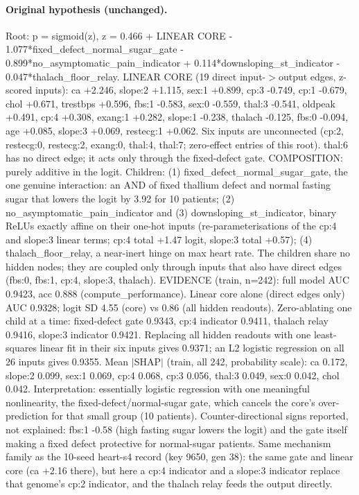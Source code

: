 \documentclass[a4paper,10pt]{article}
\newif\ifreviewmarks
\newcommand{\reviewrule}{\noindent{\color{BrickRed}\rule{\linewidth}{0.8pt}}}
\newenvironment{drafted}[1][]{%
  \ifreviewmarks\par\addvspace{\medskipamount}\reviewrule\par\nopagebreak
  \noindent{\color{BrickRed}\sffamily\footnotesize\textbf{Thesis Draft}\quad #1\hfill review}\par\nopagebreak\smallskip\fi}{%
  \ifreviewmarks\par\smallskip\noindent{\color{BrickRed}\sffamily\footnotesize end of thesis draft}\par\nopagebreak\reviewrule\par\medskip\fi}
\begin{document}
\begin{drafted}[plain-language layer: heart-s4-c1]
\paragraph{Original hypothesis (unchanged).} Root: p = sigmoid(z), z = 0.466 + LINEAR CORE - 1.077*\allowbreak{}fixed\_\allowbreak{}defect\_\allowbreak{}normal\_\allowbreak{}sugar\_\allowbreak{}gate - 0.899*\allowbreak{}no\_\allowbreak{}asymptomatic\_\allowbreak{}pain\_\allowbreak{}indicator + 0.114*\allowbreak{}downsloping\_\allowbreak{}st\_\allowbreak{}indicator - 0.047*\allowbreak{}thalach\_\allowbreak{}floor\_\allowbreak{}relay. LINEAR CORE (19 direct input-$>$output edges, z-scored inputs): ca +2.246, slope:2 +1.115, sex:1 +0.899, cp:3 -0.749, cp:1 -0.679, chol +0.671, trestbps +0.596, fbs:1 -0.583, sex:0 -0.559, thal:3 -0.541, oldpeak +0.491, cp:4 +0.308, exang:1 +0.282, slope:1 -0.238, thalach -0.125, fbs:0 -0.094, age +0.085, slope:3 +0.069, restecg:1 +0.062. Six inputs are unconnected (cp:2, restecg:0, restecg:2, exang:0, thal:4, thal:7; zero-effect entries of this root). thal:6 has no direct edge; it acts only through the fixed-defect gate. COMPOSITION: purely additive in the logit. Children: (1) fixed\_\allowbreak{}defect\_\allowbreak{}normal\_\allowbreak{}sugar\_\allowbreak{}gate,\allowbreak{} the one genuine interaction: an AND of fixed thallium defect and normal fasting sugar that lowers the logit by 3.92 for 10 patients; (2) no\_\allowbreak{}asymptomatic\_\allowbreak{}pain\_\allowbreak{}indicator and (3) downsloping\_\allowbreak{}st\_\allowbreak{}indicator,\allowbreak{} binary ReLUs exactly affine on their one-hot inputs (re-parameterisations of the cp:4 and slope:3 linear terms; cp:4 total +1.47 logit, slope:3 total +0.57); (4) thalach\_\allowbreak{}floor\_\allowbreak{}relay, a near-inert hinge on max heart rate. The children share no hidden nodes; they are coupled only through inputs that also have direct edges (fbs:0, fbs:1, cp:4, slope:3, thalach). EVIDENCE (train, n=242): full model AUC 0.9423, acc 0.888 (compute\_\allowbreak{}performance)\allowbreak{}. Linear core alone (direct edges only) AUC 0.9328; logit SD 4.55 (core) vs 0.86 (all hidden readouts). Zero-ablating one child at a time: fixed-defect gate 0.9343, cp:4 indicator 0.9411, thalach relay 0.9416, slope:3 indicator 0.9421. Replacing all hidden readouts with one least-squares linear fit in their six inputs gives 0.9371; an L2 logistic regression on all 26 inputs gives 0.9355. Mean $|$SHAP$|$ (train, all 242, probability scale): ca 0.172, slope:2 0.099, sex:1 0.069, cp:4 0.068, cp:3 0.056, thal:3 0.049, sex:0 0.042, chol 0.042. Interpretation: essentially logistic regression with one meaningful nonlinearity, the fixed-defect/\allowbreak{}normal-sugar gate, which cancels the core's over-prediction for that small group (10 patients). Counter-directional signs reported, not explained: fbs:1 -0.58 (high fasting sugar lowers the logit) and the gate itself making a fixed defect protective for normal-sugar patients. Same mechanism family as the 10-seed heart-s4 record (key 9650, gen 38): the same gate and linear core (ca +2.16 there), but here a cp:4 indicator and a slope:3 indicator replace that genome's cp:2 indicator, and the thalach relay feeds the output directly.

\end{drafted}
\end{document}
